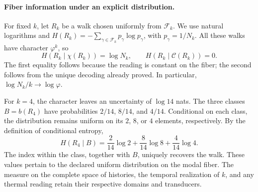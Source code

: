 \paragraph{Fiber information under an explicit distribution.}
For fixed \(k\), let \(R_k\) be a walk chosen uniformly from
\(\mathcal F_k\). We use natural logarithms and
\(H(R_k)=-\sum_{\gamma\in\mathcal F_k}p_\gamma\log p_\gamma\),
with \(p_\gamma=1/N_k\). All these walks have character
\(\varphi^k\), so
\[
 H(R_k\mid\chi(R_k))=\log N_k,\qquad
 H(R_k\mid\mathcal C(R_k))=0.
\]
The first equality follows because the reading is constant on
the fiber; the second follows from the unique decoding already
proved. In particular, \(\log N_k/k\to\log\varphi\).

For \(k=4\), the character leaves an uncertainty of \(\log14\)
nats. The three classes \(B=b(R_4)\) have probabilities
\(2/14\), \(8/14\), and \(4/14\). Conditional on each class,
the distribution remains uniform on its \(2\), \(8\), or \(4\)
elements, respectively. By the definition of conditional entropy,
\[
 H(R_4\mid B)
 =\frac2{14}\log2+\frac8{14}\log8+\frac4{14}\log4.
\]
The index within the class, together with \(B\), uniquely recovers
the walk. These values pertain to the declared uniform distribution
on the modal fiber. The measure on the complete space of histories,
the temporal realization of \(k\), and any thermal reading retain
their respective domains and transducers.
